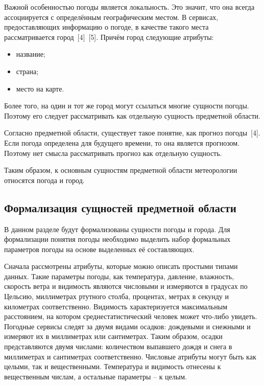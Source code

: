 Важной особенностью погоды является локальность.
Это значит, что она всегда ассоциируется с определённым географическим местом.
В сервисах, предоставляющих информацию о погоде, в качестве такого места рассматривается город~[4]~[5].
Причём город следующие атрибуты:
\begin{itemize}
    \item название;
    \item страна;
    \item место на карте.
\end{itemize}
Более того, на один и тот же город могут ссылаться многие сущности погоды.
Поэтому его следует рассматривать как отдельную сущность предметной области.

Согласно предметной области, существует такое понятие, как прогноз погоды~[4].
Если погода определена для будущего времени, то она является прогнозом.
Поэтому нет смысла рассматривать прогноз как отдельную сущность.

Таким образом, к основным сущностям предметной области метеорологии относятся погода и город.

\subsection{Формализация сущностей предметной области}
В данном разделе будут формализованы сущности погоды и города.
Для формализации понятия погоды необходимо выделить набор формальных параметров погоды на основе выделенных её составляющих.

Сначала рассмотрены атрибуты, которые можно описать простыми типами данных.
Такие параметры погоды, как температура, давление, влажность, скорость ветра и видимость являются числовыми и измеряются в градусах по Цельсию, миллиметрах ртутного столба, процентах, метрах в секунду и километрах соответственно.
Видимость характеризуется максимальным расстоянием, на котором среднестатистический человек может что-либо увидеть.
Погодные сервисы следят за двумя видами осадков: дождевыми и снежными и измеряют их в миллиметрах или сантиметрах.
Таким образом, осадки представляются двумя числами: количеством выпавшего дождя и снега в миллиметрах и сантиметрах соответственно.
Числовые атрибуты могут быть как целыми, так и вещественными.
Температура и видимость отнесены к вещественным числам, а остальные параметры -- к целым.

